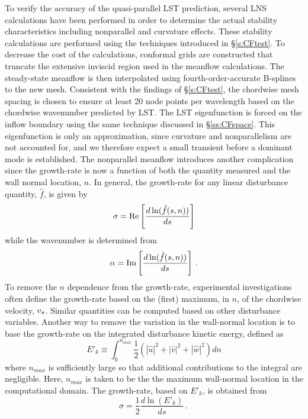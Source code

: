 To verify the accuracy of the quasi-parallel LST prediction, several LNS
calculations have been performed in order to determine the actual stability
characteristics including nonparallel and curvature effects.  These stability
calculations are performed using the techniques introduced in
\S\ref{s:CFtest}.  To decrease the cost of the calculations, conformal grids
are constructed that truncate the extensive inviscid region used in the
meanflow calculations.  The steady-state meanflow is then interpolated using
fourth-order-accurate B-splines to the new mesh.
%
%
Consistent with the findings of \S\ref{s:CFtest}, the chordwise mesh spacing
is chosen to ensure at least 20 node points per wavelength based on the
chordwise wavenumber predicted by LST.  The LST eigenfunction is forced on the
inflow boundary using the same technique discussed in \S\ref{ss:CFspace}.
This eigenfunction is only an approximation, since curvature and
nonparallelism are not accounted for, and we therefore expect a small
transient before a dominant mode is established.  The nonparallel meanflow
introduces another complication since the growth-rate is now a function of
both the quantity measured and the wall normal location, $n$.  In general, the
growth-rate for any linear disturbance quantity, $\hat f$, is given by
%
\begin{equation}
  \sigma = {\rm Re} \left[ \frac{d \ln( \hat f(s,n) )}{ds} \right]
\end{equation}
%
while the wavenumber is determined from
%
\begin{equation}
  \alpha = {\rm Im} \left[ \frac{d \ln( \hat f(s,n) )}{ds} \right] {\, .}
\end{equation}
%
To remove the $n$ dependence from the growth-rate, experimental investigations
often define the growth-rate based on the (first) maximum, in $n$, of the
chordwise velocity, ${v_s}$.  Similar quantities can be computed based on other
disturbance variables.  Another way to remove the variation in the wall-normal
location is to base the growth-rate on the integrated disturbance kinetic
energy, defined as
%
\begin{equation}
  E'_k \equiv \int_0^{n_{max}} \frac{1}{2} \left( |\hat u|^2 + 
                                     |\hat v|^2 + |\hat w|^2 \right) dn
\end{equation}
%
where $n_{max}$ is sufficiently large so that additional contributions to the
integral are negligible.  Here, $n_{max}$ is taken to be the the maximum
wall-normal location in the computational domain.  The growth-rate, based on
$E'_k$, is obtained from
%
\begin{equation}
  \sigma = \frac{1}{2} \frac{d \ln(E'_k) }{ds} \period
\end{equation}

